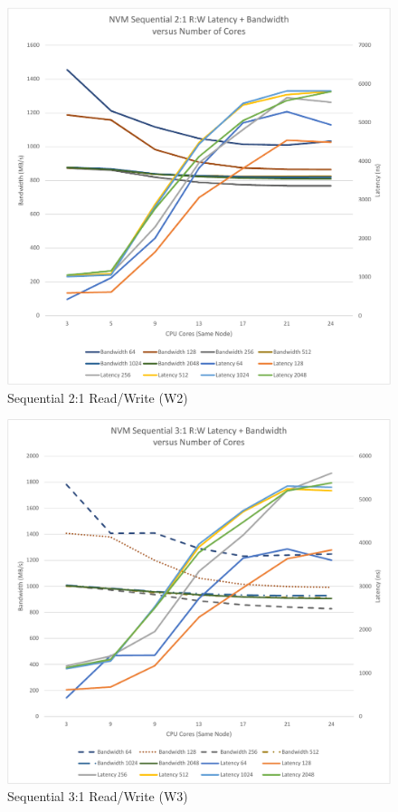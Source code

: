 \begin{figure}
    \centering
    \caption{Sequential 2:1 Read/Write (W2)}\label{chart:sequential:W2}
    \includegraphics[scale=0.5]{charts/sequential-w2-crop.pdf}
\end{figure}

\begin{figure}
    {\centering
    \caption{Sequential 3:1 Read/Write (W3)}\label{chart:sequential:w3}
    \includegraphics[scale=0.5]{charts/sequential-w3-crop.pdf}
    }
\end{figure}



